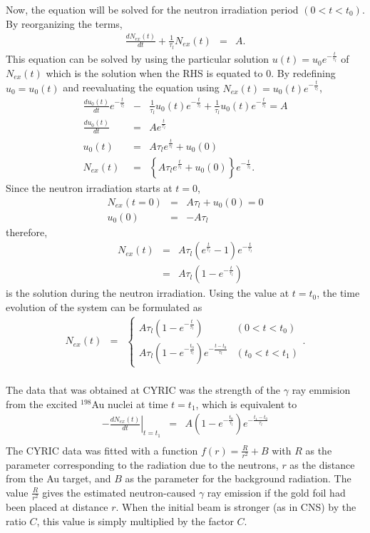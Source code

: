 \documentclass{article}
\begin{document}
Now, the equation will be solved for the neutron irradiation period $(0 < t < t_0)$. By reorganizing the terms,
\begin{eqnarray*}
\frac{dN_{ex}(t)}{dt} + \frac{1}{\tau_l} N_{ex}(t) & = & A.
\end{eqnarray*}
This equation can be solved by using the particular solution $u(t) = u_0 e^{-\frac{t}{\tau_l}}$ of $N_{ex}(t)$ which is the solution when the RHS is equated to 0. By redefining $u_0 = u_0(t)$ and reevaluating the equation using $N_{ex}(t) = u_0 (t) e^{-\frac{t}{\tau_l}}$,
\begin{eqnarray*}
\frac{du_0(t)}{dt} e^{-\frac{t}{\tau_l}} & - & \frac{1}{\tau_l} u_0 (t) e^{-\frac{t}{\tau_l}} + \frac{1}{\tau_l} u_0 (t) e^{-\frac{t}{\tau_l}} = A \\
\frac{du_0(t)}{dt} & = & A e^{\frac{t}{\tau_l}} \\
u_0 (t) & = & A\tau_l e^{\frac{t}{\tau_l}} + u_0(0) \\
N_{ex}(t) & = & \left\{ A\tau_l e^{\frac{t}{\tau_l}} + u_0(0) \right\} e^{-\frac{t}{\tau_l}} .
\end{eqnarray*}
Since the neutron irradiation starts at $t = 0$, 
\begin{eqnarray*}
N_{ex}(t = 0) & = & A\tau_l + u_0(0) = 0 \\
u_0(0) & = & -A\tau_l
\end{eqnarray*}
therefore,
\begin{eqnarray*}
N_{ex}(t) & = & A\tau_l \left( e^{\frac{t}{\tau_l}} - 1 \right) e^{-\frac{t}{\tau_l}} \\
& = & A\tau_l \left( 1 - e^{-\frac{t}{\tau_l}} \right)
\end{eqnarray*}
is the solution during the neutron irradiation. Using the value at $t = t_0$, the time evolution of the system can be formulated as
\begin{eqnarray*}
N_{ex}(t) & = & \left\{
\begin{array}{lr}
    A\tau_l \left( 1 - e^{-\frac{t}{\tau_l}} \right) & (0 < t < t_0) \\
    A\tau_l \left( 1 - e^{-\frac{t_0}{\tau_l}} \right) e^{-\frac{t-t_0}{\tau_l}} & (t_0 < t < t_1)
\end{array} \right. . \\
\end{eqnarray*}

The data that was obtained at CYRIC was the strength of the $\gamma$ ray emmision from the excited $^{198}$Au nuclei at time $t = t_1$, which is equivalent to
\begin{eqnarray*}
\left. -\frac{dN_{ex}(t)}{dt} \right|_{t = t_1} & = & A \left( 1 - e^{-\frac{t_0}{\tau_l} } \right) e^{-\frac{t_1 - t_0}{\tau_l}} \\
\end{eqnarray*}
The CYRIC data was fitted with a function $f(r) = \frac{R}{r^2} + B$ with $R$ as the parameter corresponding to the radiation due to the neutrons, $r$ as the distance from the Au target, and $B$ as the parameter for the background radiation. The value $\frac{R}{r^2}$ gives the estimated neutron-caused $\gamma$ ray emission if the gold foil had been placed at distance $r$. When the initial beam is stronger (as in CNS) by the ratio $C$, this value is simply multiplied by the factor $C$.
\end{document}
